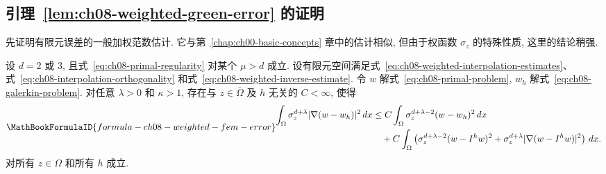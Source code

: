 \subsection{引理~\ref{lem:ch08-weighted-green-error} 的证明}
\label{sec:ch08-proof-weighted-green-error}
\setcounter{thmcount}{0}
\setcounter{equation}{0}

先证明有限元误差的一般加权范数估计. 它与第~\ref{chap:ch00-basic-concepts} 章中的估计相似, 但由于权函数 $\sigma_z$ 的特殊性质, 这里的结论稍强.

\begin{Proposition}
\label{prop:ch08-weighted-fem-error}
设 $d=2$ 或 $3$, 且式~\eqref{eq:ch08-primal-regularity} 对某个 $\mu>d$ 成立. 设有限元空间满足式~\eqref{eq:ch08-weighted-interpolation-estimates}、式~\eqref{eq:ch08-interpolation-orthogonality} 和式~\eqref{eq:ch08-weighted-inverse-estimate}. 令 $w$ 解式~\eqref{eq:ch08-primal-problem}, $w_h$ 解式~\eqref{eq:ch08-galerkin-problem}. 对任意 $\lambda>0$ 和 $\kappa>1$, 存在与 $z\in\overline\Omega$ 及 $h$ 无关的 $C<\infty$, 使得
\[
\MathBookFormulaID{formula-ch08-weighted-fem-error}
\begin{aligned}
\int_\Omega\sigma_z^{d+\lambda}|\nabla(w-w_h)|^2\,dx
&\leq C\int_\Omega\sigma_z^{d+\lambda-2}(w-w_h)^2\,dx\\
&\quad+C\int_\Omega\left(\sigma_z^{d+\lambda-2}(w-I^hw)^2
+\sigma_z^{d+\lambda}|\nabla(w-I^hw)|^2\right)\,dx.
\end{aligned}
\]
对所有 $z\in\Omega$ 和所有 $h$ 成立.
\end{Proposition}

